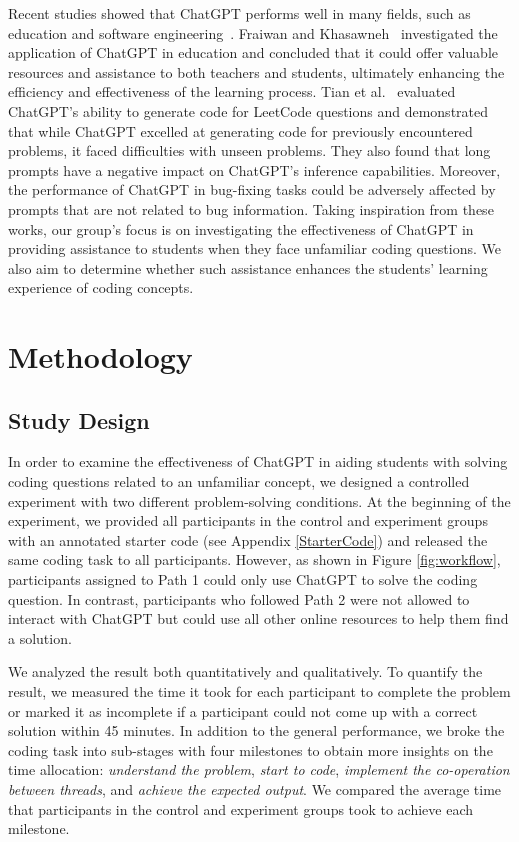\documentclass[manuscript,screen,nonacm]{acmart}
\begin{document}
Recent studies showed that ChatGPT performs well in many fields, such as education and software engineering~\cite{sobania2023analysis}. Fraiwan and Khasawneh~\cite{fraiwan2023review} investigated the application of ChatGPT in education and concluded that it could offer valuable resources and assistance to both teachers and students, ultimately enhancing the efficiency and effectiveness of the learning process. Tian et al.~\cite{tian2023chatgpt} evaluated ChatGPT’s ability to generate code for LeetCode questions and demonstrated that while ChatGPT excelled at generating code for previously encountered problems, it faced difficulties with unseen problems. They also found that long prompts have a negative impact on ChatGPT's inference capabilities. Moreover, the performance of ChatGPT in bug-fixing tasks could be adversely affected by prompts that are not related to bug information. Taking inspiration from these works, our group’s focus is on investigating the effectiveness of ChatGPT in providing assistance to students when they face unfamiliar coding questions. We also aim to determine whether such assistance enhances the students' learning experience of coding concepts.



\section{Methodology}\label{Methodology}
\subsection{Study Design}
In order to examine the effectiveness of ChatGPT in aiding students with solving coding questions related to an unfamiliar concept, we designed a controlled experiment with two different problem-solving conditions. At the beginning of the experiment, we provided all participants in the control and experiment groups with an annotated starter code (see Appendix \ref{StarterCode}) and released the same coding task to all participants. However, as shown in Figure \ref{fig:workflow}, participants assigned to Path 1 could only use ChatGPT to solve the coding question. In contrast, participants who followed Path 2 were not allowed to interact with ChatGPT but could use all other online resources to help them find a solution.

We analyzed the result both quantitatively and qualitatively. To quantify the result, we measured the time it took for each participant to complete the problem or marked it as incomplete if a participant could not come up with a correct solution within 45 minutes. In addition to the general performance, we broke the coding task into sub-stages with four milestones to obtain more insights on the time allocation: \textit{understand the problem}, \textit{start to code}, \textit{implement the co-operation between threads}, and \textit{achieve the expected output}. We compared the average time that participants in the control and experiment groups took to achieve each milestone.
\end{document}
